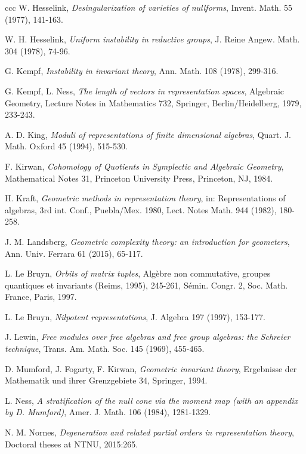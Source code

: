\documentclass[12pt]{amsart}
\begin{document}
\begin{thebibliography}{ccc}
 W. Hesselink, \textit{Desingularization of varieties of nullforms}, Invent. Math. 55 (1977), 141-163.


 W. H. Hesselink, \textit{Uniform instability in reductive groups}, J. Reine Angew. Math. 304 (1978), 74-96.


 G. Kempf, \textit{Instability in invariant theory}, Ann. Math. 108 (1978), 299-316.

 G. Kempf, L. Ness, \textit{The length of vectors in representation spaces}, Algebraic Geometry,
Lecture Notes in Mathematics 732, Springer, Berlin/Heidelberg, 1979, 233-243.

 A. D. King, \textit{Moduli of representations of finite dimensional algebras}, Quart. J. Math. Oxford 45 (1994), 515-530.

 F. Kirwan, \textit{Cohomology of Quotients in Symplectic and Algebraic Geometry}, Mathematical Notes
31, Princeton University Press, Princeton, NJ, 1984. 


 H. Kraft, 
\textit{Geometric methods in representation theory}, in: 
Representations of algebras, 3rd int. Conf., Puebla/Mex. 1980, Lect. Notes Math. 944 (1982), 
180-258. 

J. M. Landsberg, \textit{Geometric complexity theory: an introduction
for geometers}, 
Ann. Univ. Ferrara 61 (2015), 65-117. 

L. Le Bruyn, \textit{Orbits of matrix tuples}, Alg\`ebre non commutative, groupes quantiques et invariants
(Reims, 1995), 245-261, S\'emin. Congr. 2, Soc. Math. France, Paris, 1997.

L. Le Bruyn, \textit{Nilpotent representations}, J. Algebra 
197 (1997), 153-177.

J. Lewin, \textit{Free modules over free algebras and free group algebras: the Schreier technique}, 
Trans. Am. Math. Soc. 145 (1969), 455-465. 

D. Mumford, J. Fogarty, F. Kirwan, \textit{Geometric invariant theory}, Ergebnisse der Mathematik und ihrer Grenzgebiete 34, Springer, 1994.

 L. Ness, \textit{A stratification of the null cone via the moment map (with an appendix by D. Mumford)},
Amer. J. Math. 106 (1984), 1281-1329.

N. M. Nornes, \textit{Degeneration and related partial
orders in representation theory}, Doctoral theses at NTNU, 2015:265.


\end{thebibliography}
\end{document}
